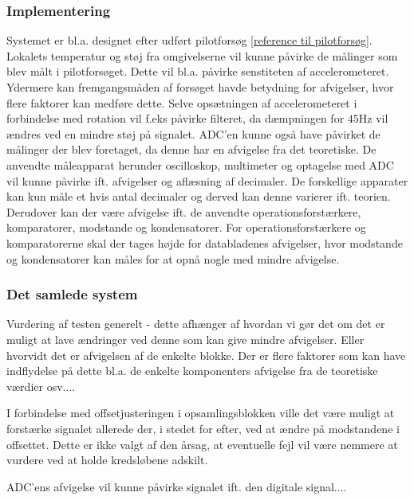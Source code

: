 \subsubsection{Implementering}
Systemet er bl.a. designet efter udført pilotforsøg \ref{reference til pilotforsøg}. Lokalets temperatur og støj fra omgivelserne vil kunne påvirke de målinger som blev målt i pilotforsøget. Dette vil bl.a. påvirke senstiteten af accelerometeret. Ydermere kan fremgangsmåden af forsøget havde betydning for afvigelser, hvor flere faktorer kan medføre dette. Selve opsætningen af accelerometeret i forbindelse med rotation vil f.eks påvirke filteret, da dæmpningen for $45$Hz vil ændres ved en mindre støj på signalet. ADC'en kunne også have påvirket de målinger der blev foretaget, da denne har en afvigelse fra det teoretiske. 
De anvendte måleapparat herunder oscilloskop, multimeter og optagelse med ADC vil kunne påvirke ift. afvigelser og aflæsning af decimaler. De forskellige apparater kan kun måle et hvis antal decimaler og derved kan denne varierer ift. teorien. Derudover kan der være afvigelse ift. de anvendte operationsforstærkere, komparatorer, modstande og kondensatorer. For operationsforstærkere og komparatorerne skal der tages højde for databladenes afvigelser, hvor modstande og kondensatorer kan måles for at opnå nogle med mindre afvigelse.
 
\subsubsection{Det samlede system}
Vurdering af testen generelt - dette afhænger af hvordan vi gør det om det er muligt at lave ændringer ved denne som kan give mindre afvigelser. Eller hvorvidt det er afvigelsen af de enkelte blokke. Der er flere faktorer som kan have indflydelse på dette bl.a. de enkelte komponenters afvigelse fra de teoretiske værdier osv....

I forbindelse med offsetjusteringen i opsamlingsblokken ville det være muligt at forstærke signalet allerede der, i stedet for efter, ved at ændre på modstandene i offsettet. Dette er ikke valgt af den årsag, at eventuelle fejl vil være nemmere at vurdere ved at holde kredsløbene adskilt.

ADC'ens afvigelse vil kunne påvirke signalet ift. den digitale signal....